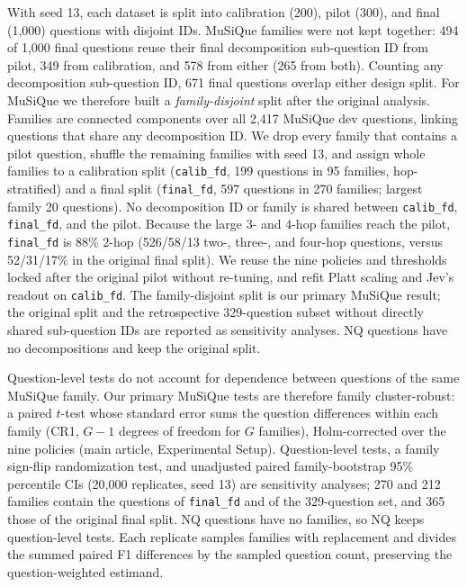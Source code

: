 With seed 13, each dataset is split into calibration (200), pilot (300), and final (1,000) questions with disjoint IDs. MuSiQue families were not kept together: 494 of 1,000 final questions reuse their final decomposition sub-question ID from pilot, 349 from calibration, and 578 from either (265 from both). Counting any decomposition sub-question ID, 671 final questions overlap either design split.
For MuSiQue we therefore built a \emph{family-disjoint} split after the original analysis. Families are connected components over all 2{,}417 MuSiQue dev questions, linking questions that share any decomposition ID. We drop every family that contains a pilot question, shuffle the remaining families with seed 13, and assign whole families to a calibration split (\texttt{calib\_fd}, 199 questions in 95 families, hop-stratified) and a final split (\texttt{final\_fd}, 597 questions in 270 families; largest family 20 questions). No decomposition ID or family is shared between \texttt{calib\_fd}, \texttt{final\_fd}, and the pilot. Because the large 3- and 4-hop families reach the pilot, \texttt{final\_fd} is 88\% 2-hop (526/58/13 two-, three-, and four-hop questions, versus 52/31/17\% in the original final split). We reuse the nine policies and thresholds locked after the original pilot without re-tuning, and refit Platt scaling and Jev's readout on \texttt{calib\_fd}. The family-disjoint split is our primary MuSiQue result; the original split and the retrospective 329-question subset without directly shared sub-question IDs are reported as sensitivity analyses. NQ questions have no decompositions and keep the original split.

Question-level tests do not account for dependence between questions of the same MuSiQue family. Our primary MuSiQue tests are therefore family cluster-robust: a paired $t$-test whose standard error sums the question differences within each family (CR1, $G-1$ degrees of freedom for $G$ families), Holm-corrected over the nine policies (main article, Experimental Setup). Question-level tests, a family sign-flip randomization test, and unadjusted paired family-bootstrap 95\% percentile CIs (20,000 replicates, seed 13) are sensitivity analyses; 270 and 212 families contain the questions of \texttt{final\_fd} and of the 329-question set, and 365 those of the original final split. NQ questions have no families, so NQ keeps question-level tests. Each replicate samples families with replacement and divides the summed paired F1 differences by the sampled question count, preserving the question-weighted estimand.

